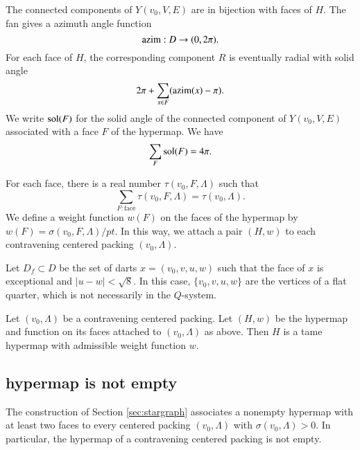 The connected components of $Y(v_0,V,E)$ are in bijection with
faces of $H$.  
The fan gives a azimuth angle function
$$
{\operatorname{azim}} : D \to (0,2\pi).
$$
For each face of $H$, the corresponding component $R$
is eventually radial with solid
angle
  $$
  2\pi + \sum_{x\in F} ({\operatorname{azim}}(x) -\pi).
  $$
We write $\operatorname{sol}(F)$ for the solid angle of the connected component
of $Y(v_0,V,E)$ associated with a face $F$ of the hypermap.
We have
    $$\sum_{F} \operatorname{sol}(F) = 4\pi.$$


For each face, there is a
real number $\tau(v_0,F,\Lambda)$ such that
$$
  \sum_{F : \text{face}}\tau(v_0,F,\Lambda) = \tau(v_0,\Lambda).
$$
We define a weight function $w(F)$ on the faces of the hypermap
by $w(F) = \sigma(v_0,F,\Lambda)/pt$.  In this way, we attach
a pair $(H,w)$ to each contravening centered packing $(v_0,\Lambda)$.


Let $D_f\subset D$ be the set of darts 
   $x = (v_0,v,u,w)$
such that the face of $x$ is exceptional and $|u-w|<\sqrt8$.
In this case, $\{v_0,v,u,w\}$ are the vertices of a flat quarter,
which is not necessarily in the $Q$-system.

\begin{theorem} \label{theorem:contravene}
Let $(v_0,\Lambda)$ be a contravening centered packing.  Let $(H,w)$ be
the hypermap and function on its faces attached to $(v_0,\Lambda)$ as above.
Then $H$ is a tame hypermap with admissible weight function $w$.
\end{theorem}

\subsection{hypermap is not empty}




\begin{lemma}
\label{prop:nonempty} The construction of Section
\ref{sec:stargraph} associates a nonempty hypermap with at least
two faces to every centered packing $(v_0,\Lambda)$ with $\sigma(v_0,\Lambda)>0$.
In particular, the hypermap of a contravening centered packing is not empty.
\end{lemma}

